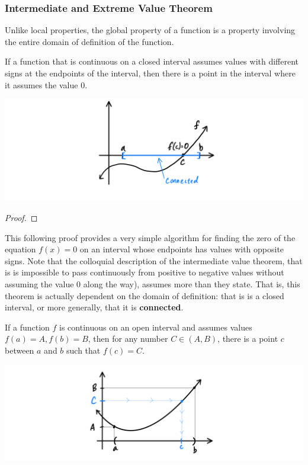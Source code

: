   \subsubsection{Intermediate and Extreme Value Theorem}

    Unlike local properties, the global property of a function is a property involving the entire domain of definition of the function. 

    \begin{theorem}
      If a function that is continuous on a closed interval assumes values with different signs at the endpoints of the interval, then there is a point in the interval where it assumes the value $0$. 
      \begin{center}
          \includegraphics[scale=0.25]{img/IVT.PNG}
      \end{center}
    \end{theorem}
    \begin{proof}

    \end{proof}

    This following proof provides a very simple algorithm for finding the zero of the equation $f(x) = 0$ on an interval whose endpoints has values with opposite signs. 
    Note that the colloquial description of the intermediate value theorem, that is is impossible to pass continuously from positive to negative values without assuming the value $0$ along the way), assumes more than they state. That is, this theorem is actually dependent on the domain of definition: that is is a closed interval, or more generally, that it is \textbf{connected}. 

    \begin{corollary}
      If a function $f$ is continuous on an open interval and assumes values $f(a) = A, f(b) = B$, then for any number $C \in (A, B)$, there is a point $c$ between $a$ and $b$ such that $f(c) = C$. 
      \begin{center}
        \includegraphics[scale=0.25]{img/Corollary_of_IVT.PNG}
      \end{center}
    \end{corollary}

